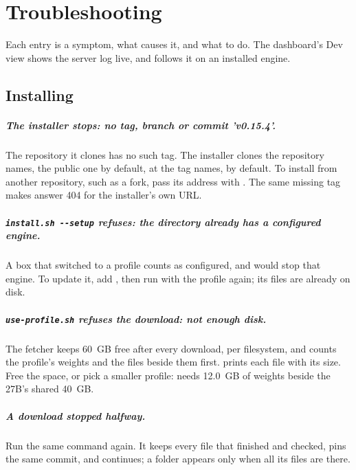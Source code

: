 \chapter{Troubleshooting}\label{ch:troubleshooting}

Each entry is a symptom, what causes it, and what to do. The dashboard's Dev view shows the server log live, and  follows it on an installed engine.

\section{Installing}\label{sec:trouble-install}

\paragraph{The installer stops: no tag, branch or commit 'v0.15.4'.} The repository it clones has no such tag. The installer clones the repository  names, the public one by default, at the tag  names,  by default. To install from another repository, such as a fork, pass its address with . The same missing tag makes  answer 404 for the installer's own URL.

\paragraph{\texttt{install.sh -{}-setup} refuses: the directory already has a configured engine.} A box that switched to a profile counts as configured, and  would stop that engine. To update it, add , then run  with the profile again; its files are already on disk.

\paragraph{\texttt{use-profile.sh} refuses the download: not enough disk.} The fetcher keeps 60~GB free after every download, per filesystem, and counts the profile's weights and the files beside them first.  prints each file with its size. Free the space, or pick a smaller profile:  needs 12.0~GB of weights beside the 27B's shared 40~GB.

\paragraph{A download stopped halfway.} Run the same  command again. It keeps every file that finished and checked, pins the same commit, and continues; a folder appears only when all its files are there.

